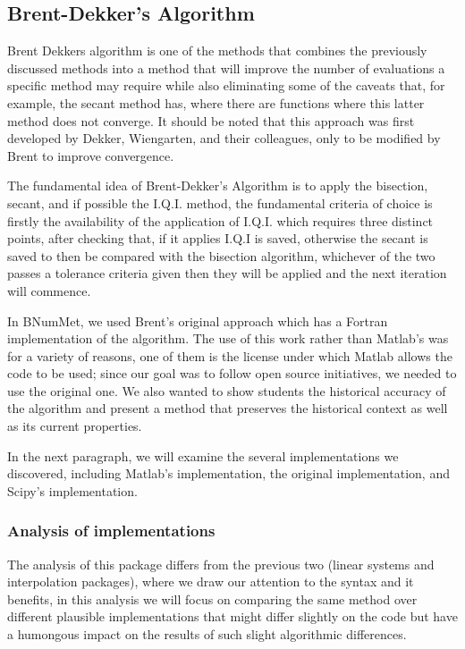 \subsection{Brent-Dekker's Algorithm}
Brent Dekkers algorithm is one of the methods that combines the previously discussed methods into a method that will improve the number of evaluations a specific method may require while also eliminating some of the caveats that, for example, the secant method has, where there are functions where this latter method does not converge.  It should be noted that this approach was first developed by Dekker, Wiengarten, and their colleagues, only to be modified by Brent to improve convergence. \cite{brent2002algorithms} 

The fundamental idea of Brent-Dekker's Algorithm is to apply the bisection, secant, and if possible the I.Q.I. method, the fundamental criteria of choice is firstly the availability of the application of I.Q.I. which requires three distinct points, after checking that, if it applies I.Q.I is saved, otherwise the secant is saved to then be compared with the bisection algorithm, whichever of the two passes a tolerance criteria given then they will be applied and the next iteration will commence.


In BNumMet, we used Brent's original approach \cite{Press2007} which has a Fortran implementation of the algorithm. The use of this work rather than Matlab's was for a variety of reasons, one of them is the license under which Matlab allows the code to be used; since our goal was to follow open source initiatives, we needed to use the original one. We also wanted to show students the historical accuracy of the algorithm and present a method that preserves the historical context as well as its current properties. 

In the next paragraph, we will examine the several implementations we discovered, including Matlab's implementation, the original implementation, and Scipy's implementation.

\subsubsection{Analysis of implementations}
The analysis of this package differs from the previous two (linear systems and interpolation packages), where we draw our attention to the syntax and it benefits, in this analysis we will focus on comparing the same method over different plausible implementations that might differ slightly on the code but have a humongous impact on the results of such slight algorithmic differences.

